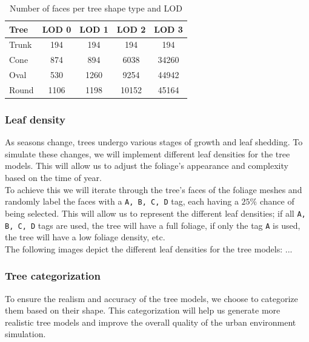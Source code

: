 \documentclass[12pt]{article}
\begin{document}
\begin{table}[H]
    \centering
    \begin{tabular}{|l|c|c|c|c|}
    \hline
    Tree & LOD 0 & LOD 1 & LOD 2 & LOD 3 \\
    \hline
    Trunk & 194 & 194 & 194 & 194 \\
    Cone & 874 & 894 & 6038 & 34260 \\
    Oval & 530 & 1260 & 9254 & 44942 \\
    Round & 1106 & 1198 & 10152 & 45164 \\
    \hline
    \end{tabular}
    \caption{Number of faces per tree shape type and LOD}
    \label{tab:my_label2}
\end{table}

\subsubsection{Leaf density}

As seasons change, trees undergo various stages of growth and leaf shedding.
To simulate these changes, we will implement different leaf densities for the
tree models. This will allow us to adjust the foliage's appearance and
complexity based on the time of year.\\

To achieve this we will iterate through the tree's faces of the foliage meshes 
and randomly label the faces with a \texttt{A, B, C, D} tag, each having a 
$25\%$ chance of being selected. This will allow us to represent the different
leaf densities; if all \texttt{A, B, C, D} tags are used, the tree will have
a full foliage, if only the tag \texttt{A} is used, the tree will have a low
foliage density, etc.\\

The following images depict the different leaf densities for the tree models:
...



\subsubsection{Tree categorization}

To ensure the realism and accuracy of the tree models, we choose to categorize
them based on their shape. This categorization will help us
generate more realistic tree models and improve the overall quality of the
urban environment simulation. \\
\end{document}
